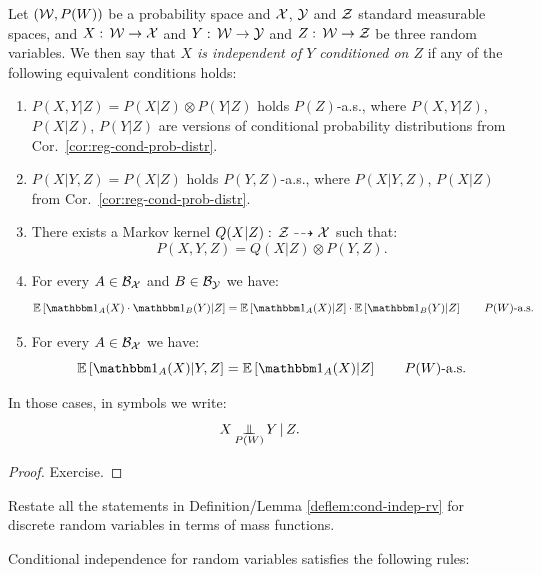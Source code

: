 \begin{DefLem}
    \label{deflem:cond-indep-rv}
        Let $(\mathcal{W},P(W))$ be a probability space and $\mathcal{X}$, $\mathcal{Y}$ and $\mathcal{Z}$ standard measurable spaces, and $X:\, \mathcal{W} \to \mathcal{X}$ and $Y:\, \mathcal{W} \to \mathcal{Y}$ and $Z:\, \mathcal{W} \to \mathcal{Z}$ be three random variables. 
        We then say that \emph{$X$ is independent of $Y$ conditioned on $Z$} if any of the following equivalent conditions holds:
    \begin{enumerate}
        \item $\displaystyle P(X,Y|Z) = P(X|Z) \otimes P(Y|Z)$ holds  $P(Z)$-a.s.,
            where $P(X,Y|Z)$, $P(X|Z)$, $P(Y|Z)$ are versions of conditional probability distributions from Cor.\ \ref{cor:reg-cond-prob-distr}.
        \item $\displaystyle P(X|Y,Z) = P(X|Z)$ holds  $P(Y,Z)$-a.s., where $P(X|Y,Z)$, $P(X|Z)$ from Cor.\ \ref{cor:reg-cond-prob-distr}.
        \item There exists a Markov kernel $Q(X|Z):\, \mathcal{Z} \dashrightarrow \mathcal{X}$ such that:
            \[ P(X,Y,Z) = Q(X|Z) \otimes P(Y,Z).\]
        \item For every $A \in \mathcal{B}_{\mathcal{X}}$ and $B \in \mathcal{B}_{\mathcal{Y}}$ we have:
            \[ \E\lB \I_A(X) \cdot \I_B(Y) |Z\rB = \E\lB \I_A(X) |Z\rB \cdot \E\lB \I_B(Y) |Z\rB\qquad P(W)\text{-a.s.} \]        \item For every $A \in \mathcal{B}_{\mathcal{X}}$ we have:
            \[ \E\lB \I_A(X)  |Y, Z\rB = \E\lB \I_A(X) |Z\rB \qquad P(W)\text{-a.s.} \]
    \end{enumerate}
    In those cases, in symbols we write:
    \[ X \operatorname*{\perp\mkern-11mu\perp}_{P(W)} Y \operatorname*{|} Z.\]
    \begin{proof}
        Exercise.
    \end{proof}
\end{DefLem}

\begin{Exc}
    Restate all the statements in Definition/Lemma \ref{deflem:cond-indep-rv} for discrete random variables in terms of mass functions.
\end{Exc}


Conditional independence for random variables satisfies the following rules:

